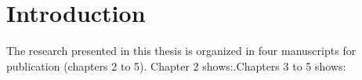 \chapter{Introduction}
The research presented in this thesis is organized in four manuscripts for publication (chapters 2 to 5). Chapter 2 shows:.Chapters 3 to 5 shows: